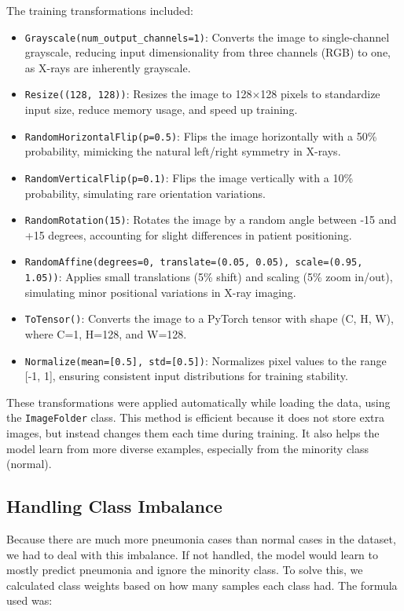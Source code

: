 \documentclass[a4paper,11pt]{article}
\begin{document}
The training transformations included:
\begin{itemize}
    \begin{itemize}
        \item \texttt{Grayscale(num\_output\_channels=1)}: Converts the image to single-channel grayscale, reducing input dimensionality from three channels (RGB) to one, as X-rays are inherently grayscale.
        \item \texttt{Resize((128, 128))}: Resizes the image to 128$\times$128 pixels to standardize input size, reduce memory usage, and speed up training.
        \item \texttt{RandomHorizontalFlip(p=0.5)}: Flips the image horizontally with a 50\% probability, mimicking the natural left/right symmetry in X-rays.
        \item \texttt{RandomVerticalFlip(p=0.1)}: Flips the image vertically with a 10\% probability, simulating rare orientation variations.
        \item \texttt{RandomRotation(15)}: Rotates the image by a random angle between -15 and +15 degrees, accounting for slight differences in patient positioning.
        \item \texttt{RandomAffine(degrees=0, translate=(0.05, 0.05), scale=(0.95, 1.05))}: Applies small translations (5\% shift) and scaling (5\% zoom in/out), simulating minor positional variations in X-ray imaging.
        \item \texttt{ToTensor()}: Converts the image to a PyTorch tensor with shape (C, H, W), where C=1, H=128, and W=128.
        \item \texttt{Normalize(mean=[0.5], std=[0.5])}: Normalizes pixel values to the range [-1, 1], ensuring consistent input distributions for training stability.
    \end{itemize}
\end{itemize}

These transformations were applied automatically while loading the data, using the \texttt{ImageFolder} class. This method is efficient because it does not store extra images, but instead changes them each time during training. It also helps the model learn from more diverse examples, especially from the minority class (normal).

\subsection{Handling Class Imbalance}
Because there are much more pneumonia cases than normal cases in the dataset, we had to deal with this imbalance. If not handled, the model would learn to mostly predict pneumonia and ignore the minority class. To solve this, we calculated class weights based on how many samples each class had. The formula used was:
\end{document}
